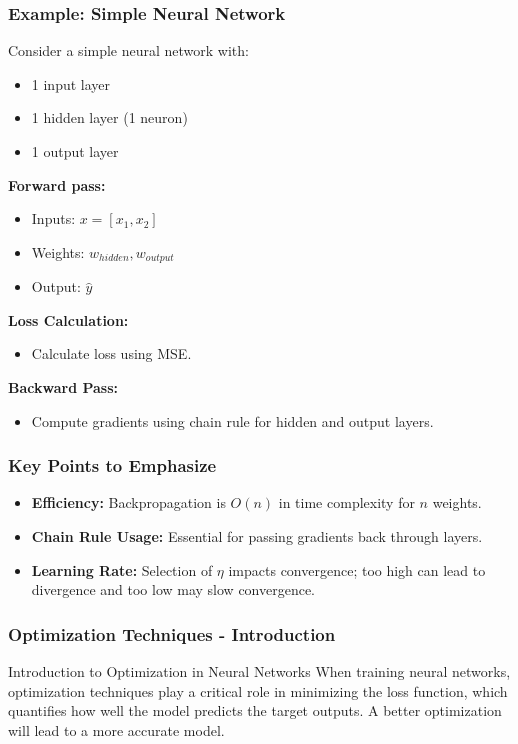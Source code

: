 \documentclass[aspectratio=169]{beamer}
\begin{document}
\begin{frame}[fragile]
    \frametitle{Example: Simple Neural Network}
    Consider a simple neural network with:
    \begin{itemize}
        \item 1 input layer
        \item 1 hidden layer (1 neuron)
        \item 1 output layer
    \end{itemize}
    
    \textbf{Forward pass:}
    \begin{itemize}
        \item Inputs: \(x = [x_1, x_2]\)
        \item Weights: \(w_{hidden}, w_{output}\)
        \item Output: \(\hat{y}\)
    \end{itemize}
    
    \textbf{Loss Calculation:}
    \begin{itemize}
        \item Calculate loss using MSE.
    \end{itemize}
    
    \textbf{Backward Pass:}
    \begin{itemize}
        \item Compute gradients using chain rule for hidden and output layers.
    \end{itemize}
\end{frame}

\begin{frame}[fragile]
    \frametitle{Key Points to Emphasize}
    \begin{itemize}
        \item \textbf{Efficiency:} Backpropagation is \(O(n)\) in time complexity for \(n\) weights.
        \item \textbf{Chain Rule Usage:} Essential for passing gradients back through layers.
        \item \textbf{Learning Rate:} Selection of \(\eta\) impacts convergence; too high can lead to divergence and too low may slow convergence.
    \end{itemize}
\end{frame}

\begin{frame}[fragile]
    \frametitle{Optimization Techniques - Introduction}
    \begin{block}{Introduction to Optimization in Neural Networks}
        When training neural networks, optimization techniques play a critical role in minimizing the loss function, which quantifies how well the model predicts the target outputs. A better optimization will lead to a more accurate model.
    \end{block}
\end{frame}
\end{document}
